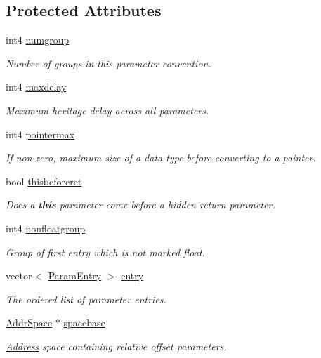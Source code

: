\subsection*{Protected Attributes}
\begin{DoxyCompactItemize}
\item 
int4 \mbox{\hyperlink{class_param_list_standard_ae129a4db3bb767656a32daeffee806a5}{numgroup}}
\begin{DoxyCompactList}\small\item\em Number of {\itshape groups} in this parameter convention. \end{DoxyCompactList}\item 
int4 \mbox{\hyperlink{class_param_list_standard_afe373fd5fb7807b7bba1d83649469cab}{maxdelay}}
\begin{DoxyCompactList}\small\item\em Maximum heritage delay across all parameters. \end{DoxyCompactList}\item 
int4 \mbox{\hyperlink{class_param_list_standard_aef1c07a708c2278a4a51705a4601035c}{pointermax}}
\begin{DoxyCompactList}\small\item\em If non-\/zero, maximum size of a data-\/type before converting to a pointer. \end{DoxyCompactList}\item 
bool \mbox{\hyperlink{class_param_list_standard_a65af086fa366444a788721fecc8afc86}{thisbeforeret}}
\begin{DoxyCompactList}\small\item\em Does a {\bfseries{this}} parameter come before a hidden return parameter. \end{DoxyCompactList}\item 
int4 \mbox{\hyperlink{class_param_list_standard_a512864be48d391ee4903d0a38147438c}{nonfloatgroup}}
\begin{DoxyCompactList}\small\item\em Group of first entry which is not marked float. \end{DoxyCompactList}\item 
vector$<$ \mbox{\hyperlink{class_param_entry}{Param\+Entry}} $>$ \mbox{\hyperlink{class_param_list_standard_a0e3608702649b37ea0dd8d1c5a5abc00}{entry}}
\begin{DoxyCompactList}\small\item\em The ordered list of parameter entries. \end{DoxyCompactList}\item 
\mbox{\hyperlink{class_addr_space}{Addr\+Space}} $\ast$ \mbox{\hyperlink{class_param_list_standard_a23eb96cd5ffb8cc27ffb71caed2d96ca}{spacebase}}
\begin{DoxyCompactList}\small\item\em \mbox{\hyperlink{class_address}{Address}} space containing relative offset parameters. \end{DoxyCompactList}\end{DoxyCompactItemize}
